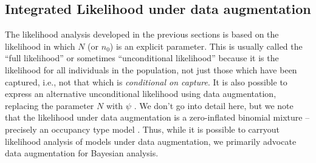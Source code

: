 \begin{comment}

\subsection{Exercises}

{\flushleft 
{\bf 1.}	
Run the analysis with different state-space buffers and comment on the result. 
}


{\flushleft 
{\bf 2.} Conduct a brief simulation study using this code by
  simulating 100 data sets and obtain the MLEs for each data set. Do
  things seem to be working as you expect?  }

{\flushleft 
{\bf 3.} 
Further extensions: It should be straightforward to
  generalize the integrated likelihood function to accommodate many
  different situations. For examples, if we want to include more
  covariates in the model we can just add stuff to the object \mbox{\tt probcap},
 and add the relevant parameters to the argument that gets
  passed to the main  function.  For the simulated data, make up a
  covariate by generating a Bernoulli covariate (``trap type'', perhaps
  baited or not baited) randomly and try to modify the likelihood to
  accommodate that.  }

{\flushleft {\bf 4.}  We would probably be interested in devising the
  integrated likelihood for the full 3-d encounter history array so
  that we could include temporally varying covariates. This is not
  difficult but naturally will slow down the execution
  substantially. The interested reader should try to expand the
  capabilities of this basic {\bf R} function.  }
\end{comment}




\subsection{Integrated Likelihood  under data augmentation } 
\label{mle.sec.intlikDA}

The likelihood analysis developed in the previous sections
is based on the likelihood
in which $N$ (or $n_{0}$) is an explicit parameter. This is usually called
the ``full likelihood'' or sometimes ``unconditional likelihood''
\citep{borchers_etal:2002} because it is the likelihood for all
individuals in the population, not just those which have been
captured, i.e., not that which is {\it conditional on capture}.
It is also possible to 
express an alternative unconditional  likelihood using data augmentation, replacing the
parameter $N$ with $\psi$ \citep[e.g., see Sec. 7.1.6][for an example]{royle_dorazio:2008}.
We don't go into detail here, but we note that the
likelihood under data augmentation is a zero-inflated binomial
mixture -- precisely an occupancy type model \citep{royle:2006}.
Thus, while it is possible to carryout likelihood analysis of
models under data augmentation, we primarily advocate data
augmentation for Bayesian analysis.



